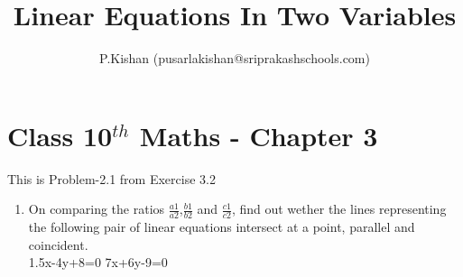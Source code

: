 \documentclass[10pt]{article}
\title{Linear Equations In Two Variables}
\author{P.Kishan (pusarlakishan@sriprakashschools.com)}
\begin{document}
\maketitle
\section*{Class 10$^{th}$ Maths - Chapter 3}
This is Problem-2.1 from Exercise 3.2
\begin{enumerate}
\item On comparing the ratios $\frac{a1}{a2}$,$\frac{b1}{b2}$ and $\frac{c1}{c2}$, find out wether the lines representing the following pair of linear equations intersect at a point, parallel and coincident.\\
1.5x-4y+8=0
  7x+6y-9=0
\end{enumerate}
\end{document}
